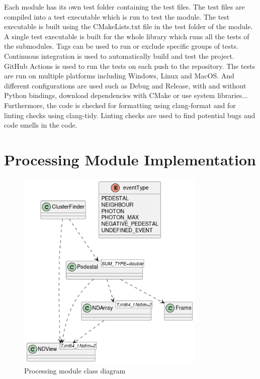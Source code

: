 \begin{spacing}{1.2}
    Each module has its own test folder containing the test files. The test files are compiled
    into a test executable which is run to test the module. The test executable is built using
    the CMakeLists.txt file in the test folder of the module. A single test executable is built
    for the whole library which runs all the tests of the submodules. Tags can be used to run or exclude
    specific groups of tests.\\

    Continuous integration is used to automatically build and test the project. GitHub Actions
    is used to run the tests on each push to the repository. The tests are run on multiple
    platforms including Windows, Linux and MacOS. And different configurations are used such
    as Debug and Release, with and without Python bindings, download dependencies with CMake or use system libraries...
    Furthermore, the code is checked for formatting using clang-format and for linting checks using clang-tidy.
    Linting checks are used to find potential bugs and code smells in the code.\\



    

    \section{Processing Module Implementation}
    \begin{figure}
        \centering
        \includegraphics[width=0.8\textwidth]{Chapitre3/figures/processing_class.png}
        \caption{Processing module class diagram}
        \label{fig:processing}
    \end{figure}


\end{spacing}

